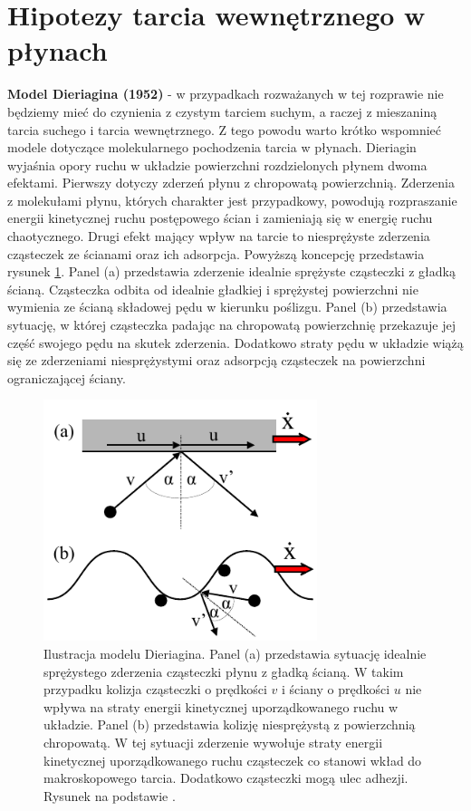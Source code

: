 \documentclass[12pt,a4paper,openright]{report} %
\begin{document}
\section{Hipotezy tarcia wewnętrznego w płynach}
\noindent
\textbf{Model Dieriagina (1952)} - w przypadkach rozważanych w tej rozprawie nie będziemy mieć do czynienia z czystym tarciem suchym, a raczej z mieszaniną tarcia suchego i tarcia wewnętrznego. Z tego powodu warto krótko wspomnieć modele dotyczące molekularnego pochodzenia tarcia w płynach. Dieriagin \cite{Dieriagin} wyjaśnia opory ruchu w układzie powierzchni rozdzielonych płynem dwoma efektami. Pierwszy dotyczy zderzeń płynu z chropowatą powierzchnią. Zderzenia z molekułami płynu, których charakter jest przypadkowy, powodują rozpraszanie energii kinetycznej ruchu postępowego ścian i zamieniają się w energię ruchu chaotycznego. Drugi efekt mający wpływ na tarcie to niesprężyste zderzenia cząsteczek ze ścianami oraz ich adsorpcja. Powyższą koncepcję przedstawia rysunek \ref{DGmodel}. Panel (a) przedstawia zderzenie idealnie sprężyste cząsteczki z gładką ścianą. Cząsteczka odbita od idealnie gładkiej i sprężystej powierzchni nie wymienia ze ścianą składowej pędu w kierunku poślizgu. Panel (b) przedstawia sytuację, w której cząsteczka padając na chropowatą powierzchnię przekazuje jej część swojego pędu na skutek zderzenia. Dodatkowo straty pędu w układzie wiążą się ze zderzeniami niesprężystymi oraz adsorpcją cząsteczek na powierzchni ograniczającej ściany.
\begin{figure}[h!]
\centering
\includegraphics[width=8cm, clip]{rysunki/DGmodel.pdf}
\caption{Ilustracja modelu Dieriagina. Panel (a) przedstawia sytuację idealnie sprężystego zderzenia cząsteczki płynu z gładką ścianą. W takim przypadku kolizja cząsteczki o prędkości $v$ i ściany o prędkości $u$ nie wpływa na straty energii kinetycznej uporządkowanego ruchu w układzie. Panel (b) przedstawia kolizję niesprężystą z powierzchnią chropowatą. W tej sytuacji zderzenie wywołuje straty energii kinetycznej uporządkowanego ruchu cząsteczek co stanowi wkład do makroskopowego tarcia. Dodatkowo cząsteczki mogą ulec adhezji. Rysunek na podstawie \cite{Dieriagin}.}
\label{DGmodel}
\end{figure}
\end{document}

